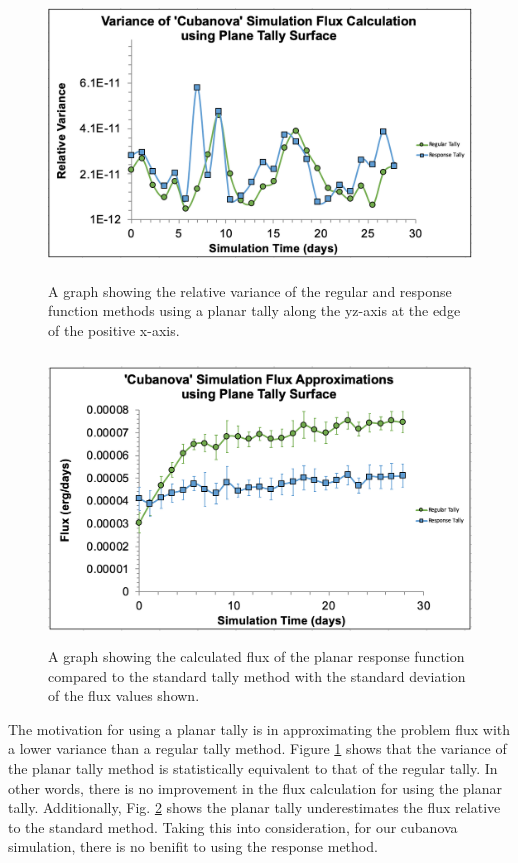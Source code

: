 \documentclass[]{article}
\begin{document}
		\begin{figure} [h!]
			\centering
			\includegraphics[height=3in]{Figures/plane_response_var.png}
			\caption{A graph showing the relative variance of the regular and response function methods using a planar tally along the yz-axis at the edge of the positive x-axis.}
			\label{fig:plane_response_var}
		\end{figure}
		
		\begin{figure} [h!]
			\centering
			\includegraphics[height=3in]{Figures/plane_avg_error.png}
			\caption{A graph showing the calculated flux of the planar response function compared to the standard tally method with the standard deviation of the flux values shown. }
			\label{fig:plane_avg_flux}
		\end{figure}
		
		The motivation for using a planar tally is in approximating the problem flux with a lower variance than a regular tally method. Figure \ref{fig:plane_response_var} shows that the variance of the planar tally method is statistically equivalent to that of the regular tally. In other words, there is no improvement in the flux calculation for using the planar tally. Additionally, Fig. \ref{fig:plane_avg_flux} shows the planar tally underestimates the flux relative to the standard method. Taking this into consideration, for our cubanova simulation, there is no benifit to using the response method. 
		
\end{document}
